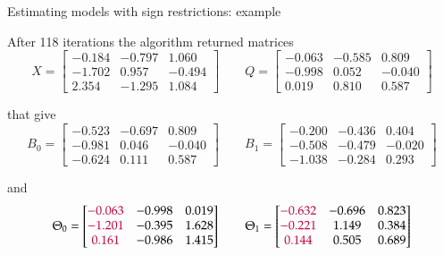 \documentclass[notes,blackandwhite,mathsans,usenames,dvipsnames]{beamer}
\begin{document}
\begin{frame}{Estimating models with sign restrictions: example}

{\color{mcxs2}After} 118 {\color{mcxs2}iterations the algorithm returned matrices} \scriptsize
$$ X = \begin{bmatrix}
-0.184& -0.797&  1.060\\
-1.702&  0.957& -0.494\\
2.354& -1.295&  1.084
\end{bmatrix}\qquad
Q=
\begin{bmatrix}
-0.063& -0.585&  0.809\\
-0.998&  0.052& -0.040\\
0.019&  0.810&  0.587
\end{bmatrix}
 $$
 
\normalsize {\color{mcxs2}that give} \scriptsize
$$ B_0 = \begin{bmatrix}
-0.523& -0.697&  0.809\\
-0.981&  0.046& -0.040\\
-0.624&  0.111&  0.587
\end{bmatrix}\qquad
B_1=
\begin{bmatrix}
-0.200& -0.436&  0.404\\
-0.508& -0.479& -0.020\\
-1.038& -0.284&  0.293
\end{bmatrix}
 $$
 
\normalsize {\color{mcxs2}and} \scriptsize
$$ \Theta_0 = \begin{bmatrix}
{\color{purple}-0.063}& -0.998& 0.019\\
{\color{purple}-1.201}& -0.395& 1.628\\
{\color{purple}0.161}& -0.986& 1.415\\
\end{bmatrix}\qquad
\Theta_1=
\begin{bmatrix}
{\color{purple}-0.632}& -0.696& 0.823\\
{\color{purple}-0.221}&  1.149& 0.384\\
{\color{purple}0.144}&  0.505& 0.689	
\end{bmatrix}
 $$
 
\end{frame}
\end{document}
